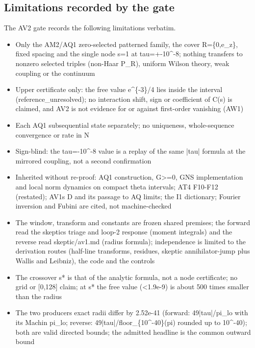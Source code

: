 \subsection{Limitations recorded by the gate}
\label{sec:av2-limits}
The AV2 gate records the following limitations verbatim.
\begin{gatequote}
\begin{itemize}
\item Only the AM2/AQ1 zero-selected patterned family, the cover R=\{0,e\_z\},
fixed spacing and the single node s=1 at tau=+-10\textasciicircum{}-8; nothing
transfers to nonzero selected triples (non-Haar P\_R), uniform Wilson theory,
weak coupling or the continuum
\item Upper certificate only: the free value e\textasciicircum{}\{-3\}/4 lies
inside the interval (reference\_unresolved); no interaction shift, sign or
coefficient of C(s) is claimed, and AV2 is not evidence for or against
first-order vanishing (AW1)
\item Each AQ1 subsequential state separately; no uniqueness, whole-sequence
convergence or rate in N
\item Sign-blind: the tau=-10\textasciicircum{}-8 value is a replay of the
same |tau| formula at the mirrored coupling, not a second confirmation
\item Inherited without re-proof: AQ1 construction, G>=0, GNS implementation
and local norm dynamics on compact theta intervals; AT4 F10-F12 (restated);
AV1\textquotesingle{}s D and its passage to AQ limits; the I1 dictionary; Fourier inversion and
Fubini are cited, not machine-checked
\item The window, transform and constants are frozen shared premises; the
forward read the skeptic\textquotesingle{}s triage and loop-2 response (moment integrals) and
the reverse read skeptic/av1.md (radius formula); independence is limited to
the derivation routes (half-line transforms, residues, skeptic
annihilator-jump plus Wallis and Leibniz), the code and the controls
\item The crossover s* is that of the analytic formula, not a node
certificate; no grid or [0,128] claim; at s* the free value (<1.9e-9) is about
500 times smaller than the radius
\item The two producers\textquotesingle{} exact radii differ by 2.52e-41 (forward:
49|tau|/pi\_lo with its Machin pi\_lo; reverse:
49|tau|/floor\_\{10\textasciicircum{}-40\}(pi) rounded up to
10\textasciicircum{}-40); both are valid directed bounds; the admitted
headline is the common outward bound

\end{itemize}
\end{gatequote}
